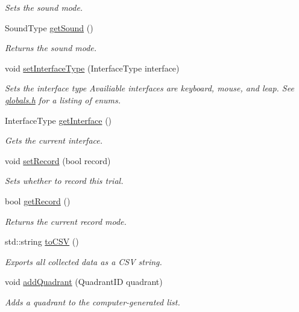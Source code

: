 \begin{DoxyCompactItemize}
\begin{DoxyCompactList}\small\item\em Sets the sound mode. \end{DoxyCompactList}\item 
Sound\+Type \hyperlink{class_game_data_ae434640dd532efa32cbe97c1e2bc66ac}{get\+Sound} ()
\begin{DoxyCompactList}\small\item\em Returns the sound mode. \end{DoxyCompactList}\item 
void \hyperlink{class_game_data_a3d9b18923e64c7f4344f261964d1d77d}{set\+Interface\+Type} (Interface\+Type interface)
\begin{DoxyCompactList}\small\item\em Sets the interface type Availiable interfaces are keyboard, mouse, and leap. See \hyperlink{globals_8h_source}{globals.\+h} for a listing of enums. \end{DoxyCompactList}\item 
Interface\+Type \hyperlink{class_game_data_a50833d359fd21bfdb518ba97ea35c4a0}{get\+Interface} ()
\begin{DoxyCompactList}\small\item\em Gets the current interface. \end{DoxyCompactList}\item 
void \hyperlink{class_game_data_a7db8e414a611835d5fe4d5e71d468fd5}{set\+Record} (bool record)
\begin{DoxyCompactList}\small\item\em Sets whether to record this trial. \end{DoxyCompactList}\item 
bool \hyperlink{class_game_data_a2945d5a0239b23f3d7ef2cd0b93bda89}{get\+Record} ()
\begin{DoxyCompactList}\small\item\em Returns the current record mode. \end{DoxyCompactList}\item 
std\+::string \hyperlink{class_game_data_ab3507672642ad7aba4daa1f95da4e075}{to\+C\+S\+V} ()
\begin{DoxyCompactList}\small\item\em Exports all collected data as a C\+S\+V string. \end{DoxyCompactList}\item 
void \hyperlink{class_game_data_a25d7626676d03bfd09dc1e2000697633}{add\+Quadrant} (Quadrant\+I\+D quadrant)
\begin{DoxyCompactList}\small\item\em Adds a quadrant to the computer-\/generated list. \end{DoxyCompactList}\item 

\end{DoxyCompactItemize}
